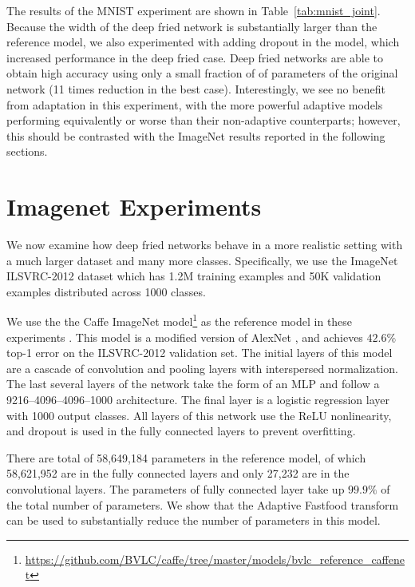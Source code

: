 \documentclass[10pt,twocolumn,letterpaper]{article}
\begin{document}
The results of the MNIST experiment are shown in Table~\ref{tab:mnist_joint}.  Because the width of the deep fried network is substantially larger than the reference model, we also experimented with adding dropout in the model, which increased performance in the deep fried case.
Deep fried networks are able to obtain high accuracy using only a small fraction of of parameters of the original network
(11 times reduction in the best case).  Interestingly, we see no benefit from adaptation in this experiment, with the more powerful adaptive models performing equivalently or worse than their non-adaptive counterparts; however, this should be contrasted with the ImageNet results reported in the following sections.




\section{Imagenet Experiments}

We now examine how deep fried networks behave in a more realistic setting with
a much larger dataset and many more classes. Specifically, we use the ImageNet
ILSVRC-2012 dataset which has 1.2M training examples and 50K validation
examples distributed across 1000 classes.

We use the the Caffe ImageNet
model\footnote{\url{https://github.com/BVLC/caffe/tree/master/models/bvlc_reference_caffenet}}
as the reference model in these experiments \cite{jia2014caffe}.  This model
is a modified version of AlexNet \cite{KrizhevskySH12}, and achieves $42.6\%$
top-1 error on the ILSVRC-2012 validation set.  The initial layers of this
model are a cascade of convolution and pooling layers with interspersed
normalization.  The last several layers of the network take the form of an MLP
and follow a 9216--4096--4096--1000 architecture.  The final layer is a
logistic regression layer with 1000 output classes.  All layers of this network
use the ReLU nonlinearity, and dropout is used in the fully connected layers to
prevent overfitting.

There are total of 58,649,184 parameters in the reference model, of which
58,621,952 are in the fully connected layers and only 27,232 are in the
convolutional layers. The parameters of fully connected layer take up $99.9\%$
of the total number of parameters. We show that the Adaptive Fastfood transform can be used to substantially reduce the number of parameters in this model.
\end{document}
